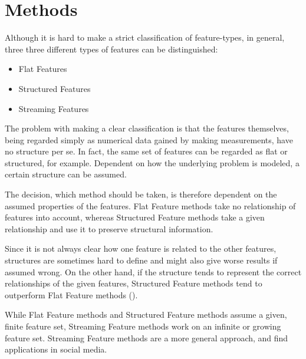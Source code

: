 \section{Methods}
\label{sec:methods}


Although it is hard to make a strict classification of feature-types,
in general, three three different types of features can be distinguished: 

\begin{itemize}
  \item Flat Features
  \item Structured Features
  \item Streaming Features
\end{itemize}

The problem with making a clear classification is that the features themselves,
being regarded simply as numerical data gained by making measurements, have no
structure per se. In fact, the same set of features can be  regarded as flat or 
structured, for example. Dependent on how the underlying problem is modeled,
a certain structure can be assumed. 

The decision, which method should be taken, is therefore dependent on the assumed 
properties of the features. Flat Feature methods take no relationship of
features into account, whereas Structured Feature methods take a given
relationship and use it to preserve structural information.

Since it is not always clear how one feature is related to the other features,
structures are sometimes hard to define and might also give worse results if assumed
wrong. On the other hand, if the structure tends to represent the correct relationships
of the given features, Structured Feature methods tend to outperform Flat
Feature methods (\cite{Tang:14}).

While Flat Feature methods and Structured Feature methods assume a given, finite
feature set, Streaming Feature methods work on an infinite or growing feature
set. Streaming Feature methods are a more general approach, and find
applications in social media.





	
